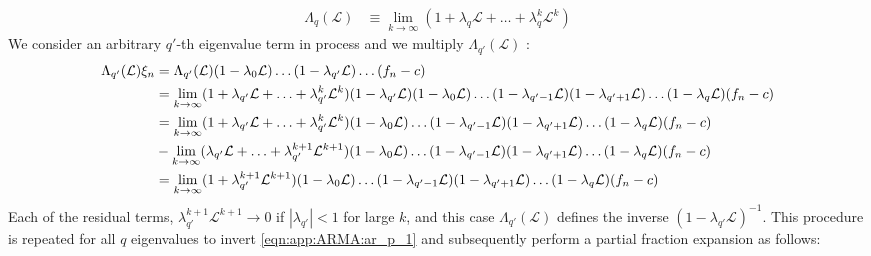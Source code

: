 \begin{align}
\Lambda_q(\mathcal{L}) & \equiv \lim_{k\to \infty} (1 + \lambda_q \mathcal{L} + \hdots + \lambda_q^k\mathcal{L}^k) \label{eqn:app:AR_inverse_0}
\end{align}
We consider an arbitrary $q'$-th eigenvalue term in process and we multiply $\Lambda_{q'}(\mathcal{L})$ :
\begin{align}
 \Lambda_{q'}(\mathcal{L}) \xi_n &= 
 \Lambda_{q'}(\mathcal{L}) (1 - \lambda_{0} \mathcal{L}) \hdots (1 - \lambda_{q'} \mathcal{L}) \hdots(f_n - c) \\
 & = \lim_{k\to \infty} (1 + \lambda_{q'} \mathcal{L} + \hdots + \lambda_{q'}^k\mathcal{L}^k)  (1 - \lambda_{q'} \mathcal{L})(1 - \lambda_{0} \mathcal{L}) \hdots (1 - \lambda_{q'-1} \mathcal{L})  (1 - \lambda_{q'+1} \mathcal{L}) \hdots(1 - \lambda_{q} \mathcal{L})(f_n - c) \\
 & = \lim_{k\to \infty} (1 + \lambda_{q'} \mathcal{L} + \hdots + \lambda_{q'}^k\mathcal{L}^k)(1 - \lambda_{0} \mathcal{L}) \hdots (1 - \lambda_{q'-1} \mathcal{L})  (1 - \lambda_{q'+1} \mathcal{L}) \hdots(1 - \lambda_{q} \mathcal{L})(f_n - c) \\
  & - \lim_{k\to \infty} (\lambda_{q'} \mathcal{L} + \hdots + \lambda_{q'}^{k+1}\mathcal{L}^{k+1})(1 - \lambda_{0} \mathcal{L}) \hdots (1 - \lambda_{q'-1} \mathcal{L})  (1 - \lambda_{q'+1} \mathcal{L}) \hdots(1 - \lambda_{q} \mathcal{L})(f_n - c) \\
& = \lim_{k\to \infty}(1 + \lambda_{q'}^{k+1}\mathcal{L}^{k+1}) (1 - \lambda_{0} \mathcal{L}) \hdots (1 - \lambda_{q'-1} \mathcal{L})  (1 - \lambda_{q'+1} \mathcal{L})\hdots (1 - \lambda_{q} \mathcal{L})(f_n - c)
\end{align}
Each of the residual terms,  $\lambda_{q'}^{k+1}\mathcal{L}^{k+1} \to 0 $ if $|\lambda_{q'}| < 1$  for large $k$, and this case $\Lambda_{q'}(\mathcal{L})$ defines the inverse $(1 - \lambda_{q'} \mathcal{L})^{-1}$. This procedure is repeated for all $q$ eigenvalues to invert \cref{eqn:app:ARMA:ar_p_1} and subsequently perform a partial fraction expansion as follows:
